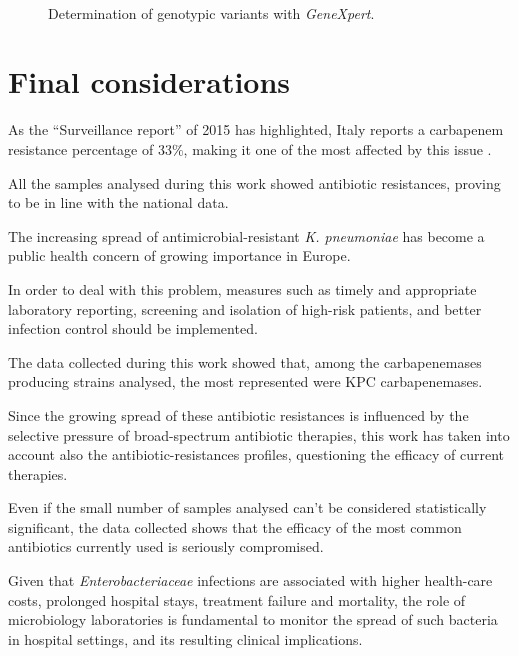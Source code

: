 \documentclass[11pt]{report}
\begin{document}
\begin{figure}[h!]
\centering

\caption{Determination of genotypic variants with \emph{GeneXpert}\textsuperscript{\textregistered}.}
\label{genexpertBar}
\end{figure}

\chapter{Final considerations}

As the ``Surveillance report'' of 2015 has highlighted, Italy reports a carbapenem resistance percentage of 33$\%$, making it one of the most affected by this issue \cite{antimicrobial2015}.

All the samples analysed during this work showed antibiotic resistances, proving to be in line with the national data.

The increasing spread of antimicrobial-resistant \emph{K. pneumoniae} has become a public health concern of growing importance in Europe.

In order to deal with this problem, measures such as timely and appropriate laboratory reporting, screening and isolation of high-risk patients, and better infection control should be implemented.

The data collected during this work showed that, among the carbapenemases producing strains analysed, the most represented were KPC carbapenemases.

Since the growing spread of these antibiotic resistances is influenced by the selective pressure of broad-spectrum antibiotic therapies, this work has taken into account also the antibiotic-resistances profiles, questioning the efficacy of current therapies.
 
Even if the small number of samples analysed can't be considered statistically significant, the data collected shows that the efficacy of the most common antibiotics currently used is seriously compromised.

Given that \emph{Enterobacteriaceae} infections are associated with higher health-care costs, prolonged hospital stays, treatment failure and mortality, the role of microbiology laboratories is fundamental to monitor the spread of such bacteria in hospital settings, and its resulting clinical implications.



\end{document}
